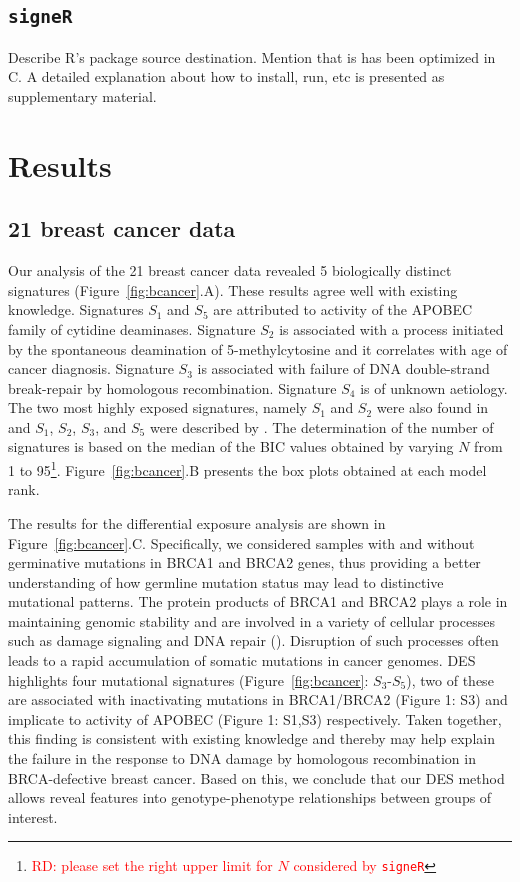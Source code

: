 \documentclass{bioinfo}
\newcommand{\CC}{C\nolinebreak\hspace{-.05em}\raisebox{.4ex}{\tiny\bf
    +}\nolinebreak\hspace{-.10em}\raisebox{.4ex}{\tiny\bf +}}
\begin{document}
\subsection{\texttt{signeR}} Describe R's package 
source destination. Mention that is has been optimized in
\CC. A detailed explanation about how to install, run, etc is 
presented as supplementary material. 

\section{Results}
\subsection{21 breast cancer data}
Our analysis of the 21 breast cancer data revealed 5 biologically
distinct signatures (Figure~\ref{fig:bcancer}.A). These results agree
well with existing knowledge. Signatures $S_1$ and $S_5$ are
attributed to activity of the  APOBEC family of cytidine
deaminases. Signature $S_2$ is associated with a process initiated by 
the spontaneous deamination of 5-methylcytosine and it correlates with 
age of cancer diagnosis. Signature $S_3$ is associated 
with failure of DNA double-strand break-repair by homologous
recombination.  Signature $S_4$ is of unknown 
aetiology. The two most highly exposed signatures, namely $S_1$ and
$S_2$ were also found in \cite{FICMV} and $S_1$, $S_2$, $S_3$, and 
$S_5$ were described by \cite{A}. The determination of the number of 
signatures is based on the median of the BIC values obtained by
varying $N$ from 1 to 95\footnote{\textcolor{red}{RD: please set the
    right upper limit for $N$ considered by \texttt{signeR}}}.
 Figure~\ref{fig:bcancer}.B presents the box
plots obtained at each model rank.

The results for the differential exposure analysis are shown in 
Figure~\ref{fig:bcancer}.C. Specifically, we considered samples
with and without germinative mutations in BRCA1 and BRCA2 genes, thus
providing a better understanding of how germline mutation status may
lead to distinctive mutational patterns. The protein products of BRCA1
and BRCA2 plays a role in maintaining genomic stability and are
involved in a variety of cellular processes such as damage signaling
and DNA repair (\citealp{LY}). Disruption of such processes often
leads to a rapid accumulation of somatic mutations in cancer
genomes. DES highlights four mutational signatures
(Figure~\ref{fig:bcancer}: $S_3$-$S_5$), two of these are associated
with inactivating mutations in BRCA1/BRCA2 (Figure 1: S3) and
implicate to activity of APOBEC (Figure 1: S1,S3) respectively. Taken
together, this finding is consistent with existing knowledge and
thereby may help explain the failure in the response to DNA damage by
homologous recombination in BRCA-defective breast cancer. Based on
this, we conclude that our DES method allows reveal features into
genotype-phenotype relationships between groups of interest.
 
\end{document}
